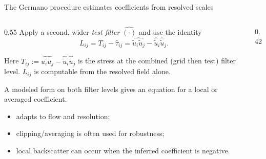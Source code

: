 \documentclass[aspectratio=169,11pt]{beamer}
\begin{document}
\begin{frame}{The Germano procedure estimates coefficients from resolved scales}
\begin{columns}[T,onlytextwidth]
\begin{column}{0.55\textwidth}
Apply a second, wider \emph{test filter} $\widehat{(\cdot)}$ and use the identity
\[
  L_{ij}=T_{ij}-\widehat{\tau}_{ij}
  =\widehat{\widetilde u_i\widetilde u_j}
   -\widehat{\widetilde u}_i\widehat{\widetilde u}_j.
\]
{\small Here $T_{ij}:=\widehat{\widetilde{u_iu_j}}-\widehat{\widetilde u}_i\widehat{\widetilde u}_j$ is the stress at the combined (grid then test) filter level. $L_{ij}$ is computable from the resolved field alone.\par}
A modeled form on both filter levels gives an equation for a local or averaged coefficient.

\begin{itemize}\itemsep0pt
  \item adapts to flow and resolution;
  \item clipping/averaging is often used for robustness;
  \item local backscatter can occur when the inferred coefficient is negative.
\end{itemize}
\end{column}
\begin{column}{0.42\textwidth}
\centering
{}
\end{column}
\end{columns}
\end{frame}
\end{document}
